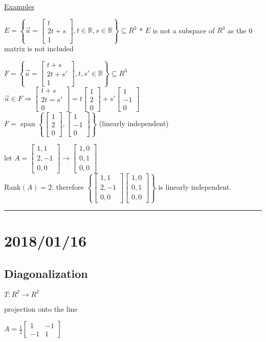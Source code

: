 \documentclass[12pt]{article}
\renewcommand{\v}[1]{\overrightarrow{#1}}
\newcommand\m[1]{\begin{bmatrix}#1\end{bmatrix}}
\newcommand{\real}[0]{\mathbb{R}}
\newenvironment{examples}{\shownto{-,compact}\underline{Examples}\enumerate}{\endenumerate\divider\endshownto}
\newcommand{\bb}[1]{\left\{#1\right\}}
\newcommand{\divider}[0]{\par\textcolor{lightgray}{\rule{\textwidth}{0.1pt}}}
\begin{document}
	\begin{examples}
		\item $E = \bb{\v{u} = \m{t \\ 2t + s \\ 1}, t \in \real, s \in \real} \subseteq R^3$
		* $E$ is not a subspace of $R^3$ as the 0 matrix is not included
		\item $F = \bb{\v{u} = \m{t + s \\ 2t + s' \\ 1}, t, s' \in \real} \subseteq R^3$ \\
		$\v{u} \in F \Rightarrow \m{t + s \\ 2t = s' \\ 0} = t\m{1 \\ 2 \\ 0} + s'\m{1 \\ -1 \\ 0}$ \\
		$F =$ span $\bb{\m{1 \\ 2 \\ 0}, \m{1 \\ -1 \\ 0}}$ (linearly independent)
		\item let $A = \m{1, 1 \\ 2, -1 \\ 0, 0} \rightarrow \m{1, 0 \\ 0, 1 \\ 0, 0}$ \\
		Rank$(A) = 2$: therefore $\bb{\m{1, 1 \\ 2, -1 \\ 0, 0} \m{1, 0 \\ 0, 1 \\ 0, 0}}$ is linearly independent.
	\end{examples}
	
	\section{2018/01/16}
	
	\subsection{Diagonalization}
	
	\(T: R^2 \rightarrow R^2\)
	
	projection onto the line
	
	\(A = \frac{1}{2} \m{1 & -1 \\ -1 & 1}\)
	
\end{document}
